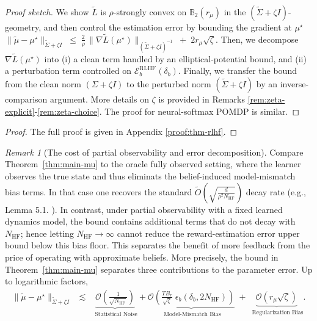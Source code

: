\documentclass[10pt]{article} %
\theoremstyle{plain}
\theoremstyle{definition}
\theoremstyle{remark}
\newtheorem{remark}[theorem]{Remark}
\newcommand{\bB}{\mathbb{B}}
\begin{document}
\begin{proof}[Proof sketch]
We show $\tilde L$ is $\rho$-strongly convex on $\bB_2(r_\mu)$ in the $(\tilde\Sigma+\zeta I)$-geometry, and then control the estimation error by bounding the gradient at $\mu^\star$ \(
\|\tilde\mu-\mu^\star\|_{\tilde\Sigma+\zeta I} \;\le\; \frac{2}{\rho}\,\|\nabla \tilde L(\mu^\star)\|_{(\tilde\Sigma+\zeta I)^{-1}} \;+\;2r_\mu\sqrt{\zeta }\). Then, we decompose $\nabla \tilde L(\mu^\star)$ into (i) a clean term handled by an elliptical-potential bound, and (ii) a perturbation term controlled on $\mathcal E_b^{\mathrm{RLHF}}(\delta_b)$. Finally, we transfer the bound from the clean norm $(\Sigma+\zeta I)$ to the perturbed norm $(\tilde\Sigma+\zeta I)$ by an inverse-comparison argument. More details on $\zeta$ is provided in Remarks \ref{rem:zeta-explicit}-\ref{rem:zeta-choice}. The proof for neural-softmax POMDP is similar.
\end{proof}

\begin{proof}
The full proof is given in Appendix \ref{proof:thm-rlhf}.
\end{proof}


\begin{remark}[The cost of partial observability and error decomposition]
Compare Theorem~\ref{thm:main-mu} to the oracle fully observed setting, where the learner observes the true state and thus eliminats the belief-induced model-mismatch bias terms. In that case one recovers the standard $
\tilde O\!\left(\sqrt{\frac{d}{\rho^2 N_{\mathrm{HF}}}}\right)
$ decay rate (e.g., Lemma 5.1. \citet{ZhuPrincipledComparisons}).
In contrast, under partial observability with a fixed learned dynamics model, the bound contains additional terms that do not decay with $N_{\mathrm{HF}}$; hence letting $N_{\mathrm{HF}}\to\infty$ cannot reduce the reward-estimation error upper bound below this bias floor. This separates the benefit of more feedback from the price of operating with approximate beliefs. More precisely, the bound in Theorem~\ref{thm:main-mu} separates three contributions to the parameter error. Up to logarithmic factors,
\begin{align*}
    \|\tilde\mu-\mu^\star\|_{\tilde\Sigma+\zeta I}\;\;\lesssim\;\;\underbrace{\mathcal{O}\!\left(\frac{1}{\sqrt{N_{\mathrm{HF}}}}\right)}_{\text{ Statistical Noise}}+\underbrace{\mathcal{O}\!\left(\frac{T B_r}{\sqrt{\zeta}}\;\epsilon_b(\delta_b,2N_{\mathrm{HF}})\right)}_{\text{ Model-Mismatch Bias}}
    \;+\;\underbrace{\mathcal{O}(r_\mu\sqrt{\zeta})}_{\text{ Regularization Bias}}.
\end{align*}

\end{remark}
\end{document}
